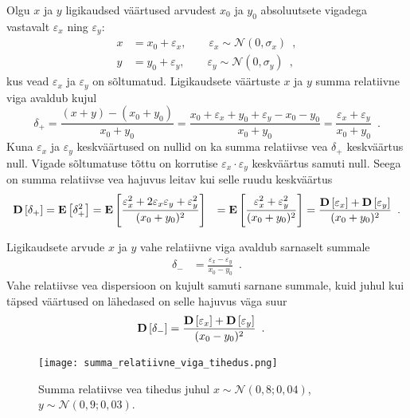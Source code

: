 Olgu $x$ ja $y$ ligikaudsed väärtused arvudest $x_0$ ja $y_0$ absoluutsete vigadega vastavalt $\varepsilon_x$ ning $\varepsilon_y$:
\begin{align*}
    x&=x_0+\varepsilon_x ,\qquad \varepsilon_x\sim\mathcal{N}(0, \sigma_x) \enspace,\\
    y&=y_0+\varepsilon_y ,\qquad \varepsilon_y\sim\mathcal{N}(0, \sigma_y) \enspace,
\end{align*}
kus vead $\varepsilon_x$ ja $\varepsilon_y$ on sõltumatud. Ligikaudsete väärtuste $x$ ja $y$ summa relatiivne viga avaldub kujul
\begin{equation*}
    \delta_{+}=\frac{(x+y)-(x_0+y_0)}{x_0+y_0}=\frac{x_0+\varepsilon_x+y_0+\varepsilon_y-x_0-y_0}{x_0+y_0}=\frac{\varepsilon_x+\varepsilon_y}{x_0+y_0} \enspace.
\end{equation*}
Kuna $\varepsilon_x$ ja $\varepsilon_y$ keskväärtused on nullid on ka summa relatiivse vea $\delta_{+}$ keskväärtus null. Vigade sõltumatuse tõttu on korrutise $\varepsilon_x\cdot\varepsilon_y$ keskväärtus samuti null. Seega on summa relatiivse vea hajuvus leitav kui selle ruudu keskväärtus
\begin{align*}
    \operatorname*{\mathbf{D}}\left[\delta_{+}\right]&=\operatorname*{\mathbf{E}}\left[\delta_{+}^2\right]=\operatorname*{\mathbf{E}}\left[\frac{\varepsilon_x^2+2\varepsilon_x\varepsilon_y+\varepsilon_y^2}{(x_0+y_0)^2}\right] 
    &=\operatorname*{\mathbf{E}}\left[\frac{\varepsilon_x^2+\varepsilon_y^2}{(x_0+y_0)^2}\right]=\frac{\operatorname*{\mathbf{D}}\left[\varepsilon_x\right]+\operatorname*{\mathbf{D}}\left[\varepsilon_y\right]}{(x_0+y_0)^2} \enspace.
\end{align*}

Ligikaudsete arvude $x$ ja $y$ vahe relatiivne viga avaldub sarnaselt summale
\begin{align*}
    \delta_{-}&=\frac{\varepsilon_x-\varepsilon_y}{x_0-y_0} \enspace.
\end{align*}
Vahe relatiivse vea dispersioon on kujult samuti sarnane summale, kuid juhul kui täpsed väärtused on lähedased on selle hajuvus väga suur
\begin{align*}
    \operatorname*{\mathbf{D}}\left[\delta_{-}\right]&=\frac{\operatorname*{\mathbf{D}}\left[\varepsilon_x\right]+\operatorname*{\mathbf{D}}\left[\varepsilon_y\right]}{(x_0-y_0)^2} \enspace.
\end{align*}

\begin{figure}[H]
    \begin{center}
        \texttt{[image: summa\_relatiivne\_viga\_tihedus.png]}
    \end{center}
    \caption{Summa relatiivse vea tihedus juhul $x\sim\mathcal{N}(0{,}8; 0{,}04)$, $y\sim\mathcal{N}(0{,}9; 0{,}03)$.}
    \label{fig:summa relatiivne viga tihedus}
\end{figure}

